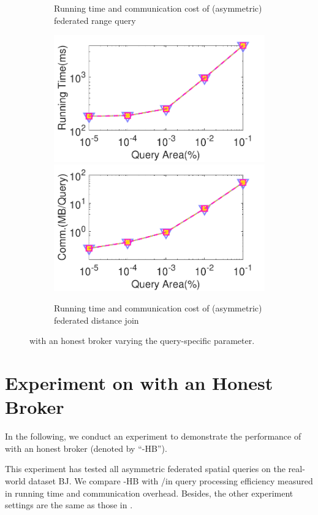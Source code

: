 \begin{figure}[t]
\begin{subfigure}{0.48\textwidth}
        \caption{Running time and communication cost of (asymmetric) federated range query}
        \label{fig:range-eff-r-n-hon}
    \end{subfigure}
      \begin{subfigure}{0.48\textwidth}
        \centering
        \includegraphics[width=0.48\linewidth]{apdx/dj_area_time.pdf}
        \includegraphics[width=0.48\linewidth]{apdx/dj_area_cost.pdf}
        \caption{Running time and communication cost of (asymmetric) federated distance join}
        \label{fig:dj-eff-r-n-hon}
    \end{subfigure}  
    \caption{\sysname with an honest broker varying the query-specific parameter.}
    \label{fig:exp-honest-para}
\end{figure}

\section{Experiment on \sysname with an Honest Broker} \label{app:exp-hb}
In the following, we conduct an experiment to demonstrate the performance of \sysname with an honest broker (denoted by ``\sysname-HB'').

This experiment has tested all asymmetric federated spatial queries on the real-world dataset BJ. We compare \sysname-HB with \smcql/\conclave in query processing efficiency measured in running time and communication overhead. Besides, the other experiment settings are the same as those in .

